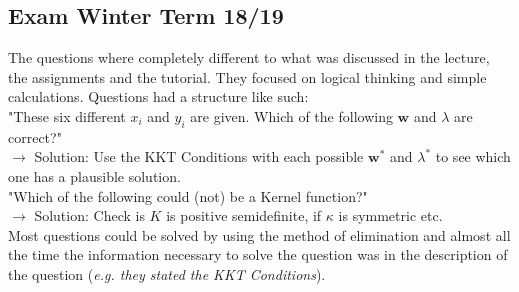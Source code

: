 \documentclass[english]{latex4ei/latex4ei_sheet}
\begin{document}
\begin{sectionbox}
\subsection{Exam Winter Term 18/19}
The questions where completely different to what was discussed in the lecture, the assignments and the tutorial. They focused on logical thinking and simple calculations. Questions had a structure like such:\\
"These six different $x_i$ and $y_i$ are given. Which of the following $\mathbf{w}$ and $\lambda$ are correct?"\\
$\rightarrow$ Solution: Use the KKT Conditions with each possible $\mathbf{w}^*$ and $\lambda^*$ to see which one has a plausible solution.\\
"Which of the following could (not) be a Kernel function?"\\
$\rightarrow$ Solution: Check is $K$ is positive semidefinite, if $\kappa$ is symmetric etc.\\
Most questions could be solved by using the method of elimination and almost all the time the information necessary to solve the question was in the description of the question (\textit{e.g. they stated the KKT Conditions}).
\end{sectionbox}
\end{document}
